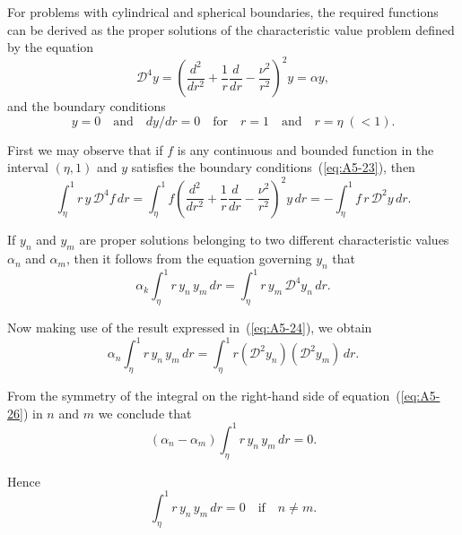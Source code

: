 For problems with cylindrical and spherical boundaries, the required
functions can be derived as the proper solutions of the characteristic
value problem defined by the equation
\begin{equation}
\label{eq:A5-22}
\mathscr{D}^4 y = \left(\frac{d^2}{dr^2} + \frac{1}{r}\frac{d}{dr} - \frac{\nu^2}{r^2}\right)^2 y = \alpha y,
\end{equation}
and the boundary conditions
\begin{equation}
\label{eq:A5-23}
y = 0 \quad \text{and} \quad dy/dr = 0 \quad \text{for} \quad r = 1 \quad \text{and} \quad r = \eta \;(< 1).
\end{equation}

First we may observe that if $f$ is any continuous and bounded function in the interval $(\eta, 1)$ and $y$ satisfies the boundary conditions~(\ref{eq:A5-23}),
then
\begin{equation}
\label{eq:A5-24}
\int_\eta^1 r \, y \, \mathscr{D}^4 f \, dr = \int_\eta^1 f \left(\frac{d^2}{dr^2} + \frac{1}{r}\frac{d}{dr} - \frac{\nu^2}{r^2}\right)^2 y \, dr
= -\int_\eta^1 f \, r \, \mathscr{D}^2 y \, dr.
\end{equation}

If $y_n$ and $y_m$ are proper solutions belonging to two different characteristic values $\alpha_n$ and $\alpha_m$, then it follows from the equation governing
$y_n$ that
\begin{equation}
\label{eq:A5-25}
\alpha_k \int_\eta^1 r \, y_n \, y_m \, dr = \int_\eta^1 r \, y_m \, \mathscr{D}^4 y_n \, dr.
\end{equation}

Now making use of the result expressed in~(\ref{eq:A5-24}), we obtain
\begin{equation}
\label{eq:A5-26}
\alpha_n \int_\eta^1 r \, y_n \, y_m \, dr = \int_\eta^1 r (\mathscr{D}^2 y_n)(\mathscr{D}^2 y_m) \, dr.
\end{equation}

From the symmetry of the integral on the right-hand side of equation~(\ref{eq:A5-26}) in $n$ and $m$ we conclude that
\begin{equation}
\label{eq:A5-27}
(\alpha_n - \alpha_m) \int_\eta^1 r \, y_n \, y_m \, dr = 0.
\end{equation}

Hence
\begin{equation}
\label{eq:A5-28}
\int_\eta^1 r \, y_n \, y_m \, dr = 0 \quad \text{if} \quad n \neq m.
\end{equation}

